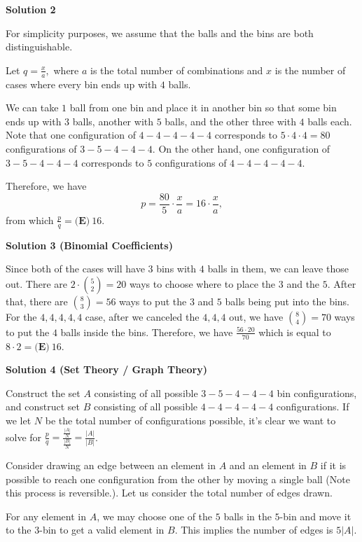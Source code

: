 \begin{enumerate}
\textbf{Solution 2}

For simplicity purposes, we assume that the balls and the bins are both distinguishable.

 Let $q=\frac{x}{a},$ where $a$ is the total number of combinations and $x$ is the number of cases where every bin ends up with $4$ balls.

 We can take $1$ ball from one bin and place it in another bin so that some bin ends up with $3$ balls, another with $5$ balls, and the other three with $4$ balls each. Note that one configuration of $4{-}4{-}4{-}4{-}4$ corresponds to $5\cdot4\cdot4=80$ configurations of $3{-}5{-}4{-}4{-}4.$ On the other hand, one configuration of $3{-}5{-}4{-}4{-}4$ corresponds to $5$ configurations of $4{-}4{-}4{-}4{-}4.$

 Therefore, we have 
 \[p = \frac{80}{5}\cdot\frac{x}{a} = 16\cdot\frac{x}{a},\] from which $\frac{p}{q} = \boxed{\textbf{(E)}\ 16}.$




\textbf{Solution 3 (Binomial Coefficients)}

Since both of the cases will have $3$ bins with $4$ balls in them, we can leave those out. There are $2 \cdot \binom {5}{2} = 20$ ways to choose where to place the $3$ and the $5$. After that, there are $\binom {8}{3} = 56$ ways to put the $3$ and $5$ balls being put into the bins. For the $4,4,4,4,4$ case, after we canceled the $4,4,4$ out, we have $\binom {8}{4} = 70$ ways to put the $4$ balls inside the bins. Therefore, we have $\frac {56\cdot 20}{70}$ which is equal to $8 \cdot 2 = \boxed{\textbf{(E)}\ 16}$.

 



\textbf{Solution 4 (Set Theory / Graph Theory)}

Construct the set $A$ consisting of all possible $3{-}5{-}4{-}4{-}4$ bin configurations, and construct set $B$ consisting of all possible $4{-}4{-}4{-}4{-}4$ configurations. If we let $N$ be the total number of configurations possible, it's clear we want to solve for $\frac{p}{q} = \frac{\frac{|A|}{N}}{\frac{|B|}{N}} = \frac{|A|}{|B|}$. 

 Consider drawing an edge between an element in $A$ and an element in $B$ if it is possible to reach one configuration from the other by moving a single ball (Note this process is reversible.). Let us consider the total number of edges drawn.

 For any element in $A$, we may choose one of the $5$ balls in the $5$-bin and move it to the $3$-bin to get a valid element in $B$. This implies the number of edges is $5|A|$. 


\end{enumerate}
